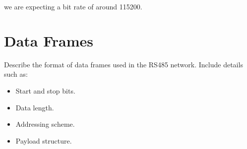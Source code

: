 \documentclass[a4paper,12pt]{article}
\begin{document}
	we are expecting a bit rate of around 115200.
	
	\section{Data Frames}
	
	Describe the format of data frames used in the RS485 network. Include details such as:
	
	\begin{itemize}[label=--]
		\item Start and stop bits.
		\item Data length.
		\item Addressing scheme.
		\item Payload structure.
	\end{itemize}
	
\end{document}
